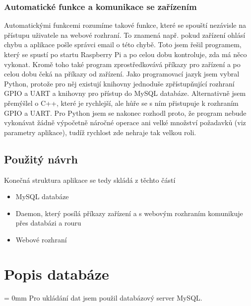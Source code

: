 \documentclass[12pt, a4paper, oneside]{article}
\begin{document}
\subsubsection{Automatické funkce a komunikace se zařízením}

Automatickými funkcemi rozumíme takové funkce, které se spouští nezávisle na přístupu uživatele na webové rozhraní.
To znamená např. pokud zařízení ohlásí chybu a aplikace pošle správci email o této chybě.
Toto jsem řešil programem, který se spustí po startu Raspberry Pi a po celou dobu kontroluje, zda má něco vykonat.
Kromě toho také program zprostředkovává příkazy pro zařízení a po celou dobu čeká na příkazy od zařízení.
Jako programovací jazyk jsem vybral Python, protože pro něj existují knihovny jednoduše zpřístupňující
rozhraní GPIO a UART a knihovny pro přístup do MySQL databáze. Alternativně jsem přemýšlel o C++, které je rychlejší, ale hůře se s ním přistupuje k rozhraním GPIO a UART.
Pro Python jsem se nakonec rozhodl proto, že program nebude vykonávat žádně výpočetně náročné operace ani velké množství požadavků (viz parametry aplikace), tudíž rychlost zde nehraje tak velkou roli.

\subsection{Použitý návrh}

Konečná struktura aplikace se tedy skládá z těchto částí

\begin{itemize}
\item MySQL databáze
\item Daemon, který posílá příkazy zařízení a s webovým rozhraním komunikuje přes databázi a rouru
\item Webové rozhraní
\end{itemize}

\section{Popis databáze}  %
\hoffset = 0mm
Pro ukládání dat jsem použil databázový server MySQL. 
\end{document}
